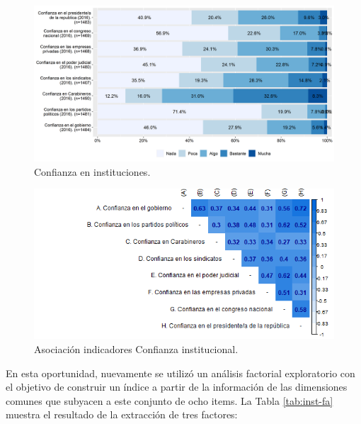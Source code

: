 \documentclass[
  12pt,
]{book}
\begin{document}
\begin{figure}[H]

{\centering \includegraphics[width=1\linewidth,height=1\textheight]{output/graphs/confianza-institucional} 

}

\caption{Confianza en instituciones.}\label{fig:confianza-institucional}
\end{figure}

\begin{figure}[H]

{\centering \includegraphics[width=1\linewidth,height=1\textheight]{output/graphs/confianza-institucional_cor} 

}

\caption{Asociación indicadores Confianza institucional.}\label{fig:confianza-institucional-cor}
\end{figure}

En esta oportunidad, nuevamente se utilizó un análisis factorial exploratorio con el objetivo de construir un índice a partir de la información de las dimensiones comunes que subyacen a este conjunto de ocho items. La Tabla \ref{tab:inst-fa} muestra el resultado de la extracción de tres factores:
\end{document}
